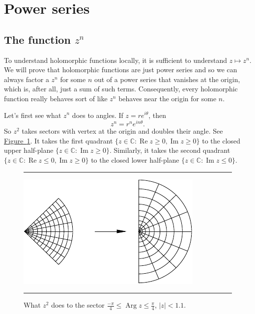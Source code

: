 \documentclass[12pt,openany]{book}
\renewcommand{\Re}{\operatorname{Re}}
\renewcommand{\Im}{\operatorname{Im}}
\newcommand{\Arg}{\operatorname{Arg}}
\newcommand{\sabs}[1]{\lvert {#1} \rvert}
\newcommand{\C}{{\mathbb{C}}}
\theoremstyle{plain}
\theoremstyle{remark}
\theoremstyle{definition}
\newenvironment{myfig}{%
\begin{figure}[h!t]
\noindent\rule{\textwidth}{0.5pt}\vspace{12pt}\par\centering}%
{\par\noindent\rule{\textwidth}{0.5pt}
\end{figure}}
\theoremstyle{exercise}
\theoremstyle{example}
\newcommand{\figureref}[1]{\hyperref[#1]{Figure~\ref*{#1}}}
\begin{document}

\section{Power series}
\label{sec:powerser}

\subsection{The function \texorpdfstring{$z^n$}{z to the n}}

To understand holomorphic functions locally, 
it is sufficient to understand $z \mapsto z^n$.  We will prove that
holomorphic functions are just power series and so we can always factor
a $z^n$ for some $n$ out of a power series that vanishes at the origin,
which is, after all, just a sum of such terms.  Consequently, every holomorphic
function really behaves sort of like $z^n$ behaves near the origin for some $n$.

Let's first see what $z^n$ does to angles.
If $z = re^{i\theta}$, then
\begin{equation*}
z^n = r^n e^{i n\theta} .
\end{equation*}
So $z^2$ takes sectors with vertex at the origin and doubles their angle.
See \figureref{fig:zsqplot}.
It takes the first quadrant
$\{ z \in \C : \Re z \geq 0, \Im z \geq 0 \}$
to the closed upper half-plane $\{ z \in \C : \Im z \geq 0 \}$.
Similarly, it takes the second quadrant
$\{ z \in \C : \Re z \leq 0, \Im z \geq 0 \}$
to the closed lower half-plane $\{ z \in \C : \Im z \leq 0 \}$.

\begin{myfig}
\includegraphics{figures/zsqplot}
\caption{What $z^2$ does to the sector
$\frac{-\pi}{4} \leq \Arg z \leq \frac{\pi}{4}$, $\sabs{z} <
1.1$.\label{fig:zsqplot}}
\end{myfig}
\end{document}
